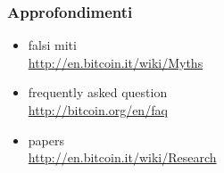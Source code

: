 \begin{frame}
	\frametitle{Approfondimenti}
	\begin{itemize}
	  \item falsi miti \\
		\url{http://en.bitcoin.it/wiki/Myths}	  
	  \item frequently asked question \\
		\url{http://bitcoin.org/en/faq}	  
	  \item papers \\
	  	\url{http://en.bitcoin.it/wiki/Research}
	\end{itemize}
\end{frame}

